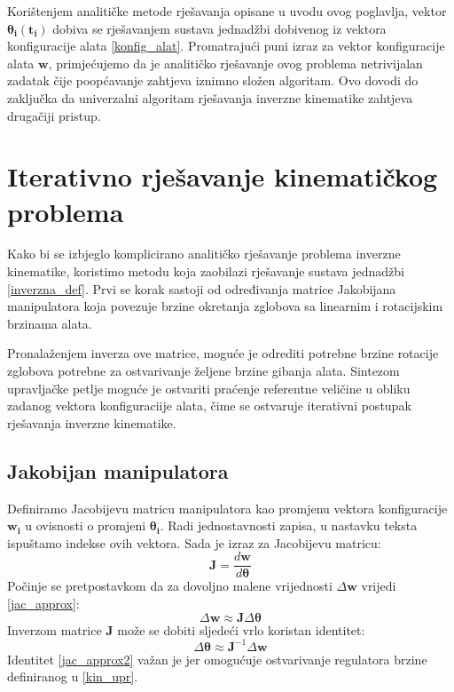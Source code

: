 \documentclass[times, utf8, diplomski, numeric]{fer}
\begin{document}
Korištenjem analitičke metode rješavanja opisane u uvodu ovog poglavlja, vektor $\bm{\theta}_{\mathbf{i}}(\mathbf{t_i})$ dobiva se rješavanjem sustava jednadžbi dobivenog iz vektora konfiguracije alata \ref{konfig_alat}. 
Promatrajući puni izraz za vektor konfiguracije alata $\mathbf{w}$, primjećujemo da je analitičko rješavanje ovog problema netrivijalan zadatak čije poopćavanje zahtjeva iznimno složen algoritam.
Ovo dovodi do zaključka da univerzalni algoritam rješavanja inverzne kinematike zahtjeva drugačiji pristup.

\section{Iterativno rješavanje kinematičkog problema}
Kako bi se izbjeglo komplicirano analitičko rješavanje problema inverzne kinematike, koristimo metodu koja zaobilazi rješavanje sustava jednadžbi \ref{inverzna_def}.
Prvi se korak sastoji od određivanja matrice Jakobijana manipulatora koja povezuje brzine okretanja zglobova sa linearnim i rotacijskim brzinama alata.

Pronalaženjem inverza ove matrice, moguće je odrediti potrebne brzine rotacije zglobova potrebne za ostvarivanje željene brzine gibanja alata.
Sintezom upravljačke petlje moguće je ostvariti praćenje referentne veličine u obliku zadanog vektora konfiguraciije alata, čime se ostvaruje iterativni postupak rješavanja inverzne kinematike.

\subsection{Jakobijan manipulatora}

Definiramo Jacobijevu matricu manipulatora kao promjenu vektora konfiguracije $\mathbf{w_i}$ u ovisnosti o promjeni $\bm{\theta}_{\mathbf{i}}$.
Radi jednostavnosti zapisa, u nastavku teksta ispuštamo indekse ovih vektora. Sada je izraz za Jacobijevu matricu:
\begin{equation}
\mathbf{J} =\frac{d\mathbf{w}}{d\bm{\theta}} \label{jakob}
\end{equation}
Počinje se pretpostavkom da za dovoljno malene vrijednosti $\Delta \mathbf{w}$ vrijedi \ref{jac_approx}:
\begin{equation}
\Delta \mathbf{w} \approx \mathbf{J}  \Delta \bm{\theta}
\label{jac_approx}
\end{equation}
Inverzom matrice $\mathbf{J}$ može se dobiti sljedeći vrlo koristan identitet:
\begin{equation}
\Delta \bm{\theta} \approx \mathbf{J}^{-1} \Delta \textbf{w}
\label{jac_approx2}
\end{equation}
Identitet \ref{jac_approx2} važan je jer omogućuje ostvarivanje regulatora brzine definiranog u \ref{kin_upr}.
\end{document}
